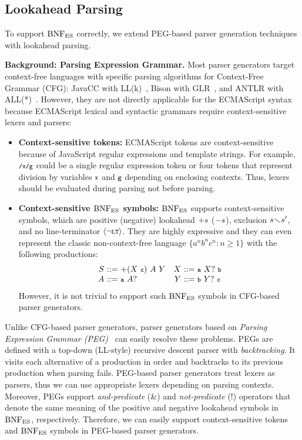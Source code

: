 \subsection{Lookahead Parsing}
To support \( \text{BNF}_{\text{ES}} \) correctly, we extend PEG-based parser generation
techniques with lookahead parsing.

\smallskip

\textbf{Background: Parsing Expression Grammar.}
Most parser generators target context-free languages with specific parsing
algorithms for Context-Free Grammar (CFG): JavaCC with LL(k)~,
Bison with GLR~, and ANTLR with
ALL(*)~.  However, they are not directly applicable for the
ECMAScript syntax because ECMAScript lexical and syntactic grammars require
context-sensitive lexers and parsers:
\begin{itemize}%
  \item \textbf{Context-sensitive tokens:}
    ECMAScript tokens are context-sensitive because of JavaScript regular
    expressions and template strings.  For example, \( \texttt{\footnotesize/x/g} \) could be a
    single regular expression token or four tokens that represent division by
    variables \( \texttt{\footnotesize x} \) and \( \texttt{\footnotesize g} \) depending on enclosing contexts.
    Thus, lexers should be evaluated during parsing not before parsing.
  \item \textbf{Context-sensitive \( \text{BNF}_{\text{ES}} \) symbols:}
    \( \text{BNF}_{\text{ES}} \) supports context-sensitive symbols, which are positive (negative)
    lookahead \( +s \) (\( -s \)), exclusion \( s \!\smallsetminus\! s' \),
    and no line-terminator \( \left<\neg\texttt{\footnotesize LT}\right> \).  They are highly expressive
    and they can even represent the classic non-context-free language \( \{ a^n b^n c^n
    : n \geq 1 \} \) with the following productions:
    \[
      \begin{array}{r@{~}c@{~}lr@{~}c@{~}l}
        \NT{S} &::=& +(\NT{X}~\T{c})~\NT{A}~\NT{Y}&
        \NT{X} &::=& \T{a}~\NT{X}?~\T{b}\\
        \NT{A} &::=& \T{a}~\NT{A}?&
        \NT{Y} &::=& \T{b}~\NT{Y}?~\T{c}\\
      \end{array}
    \]
    However, it is not trivial to support such \( \text{BNF}_{\text{ES}} \) symbols in CFG-based
    parser generators.
\end{itemize}

Unlike CFG-based parser generators, parser generators based on \textit{Parsing
Expression Grammar (PEG)}~\cite{peg} can easily resolve these problems.  PEGs
are defined with a top-down (LL-style) recursive descent parser with
\textit{backtracking}.  It visits each alternative of a production in order and
backtracks to its previous production when parsing fails.  PEG-based parser
generators treat lexers as parsers, thus we can use appropriate lexers depending
on parsing contexts.  Moreover, PEGs support \textit{and-predicate} (\&) and
\textit{not-predicate} (!) operators that denote the same meaning of the
positive and negative lookahead symbols in \( \text{BNF}_{\text{ES}} \), respectively. Therefore, we
can easily support context-sensitive tokens and \( \text{BNF}_{\text{ES}} \) symbols in
PEG-based parser generators.

